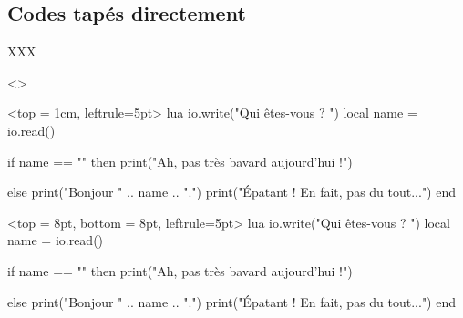 \documentclass{../main/main}
\begin{document}
\subsection{Codes tapés directement}

XXX

\begin{tdoclatex}<>
\begin{tdocode}[style=solarized-light, linenos]%
               <top = 1cm, leftrule=5pt>%
               {lua}
io.write("Qui êtes-vous ? ")
local name = io.read()

if name == "" then
    print("Ah, pas très bavard aujourd'hui !")

else
    print("Bonjour " .. name .. ".")
    print("Épatant ! En fait, pas du tout...")
end
\end{tdocode}
\end{tdoclatex}


\begin{tdocode}[style=solarized-light, linenos]%
               <top = 8pt, bottom = 8pt, leftrule=5pt>%
               {lua}
io.write("Qui êtes-vous ? ")
local name = io.read()

if name == "" then
    print("Ah, pas très bavard aujourd'hui !")

else
    print("Bonjour " .. name .. ".")
    print("Épatant ! En fait, pas du tout...")
end
\end{tdocode}
\end{document}
